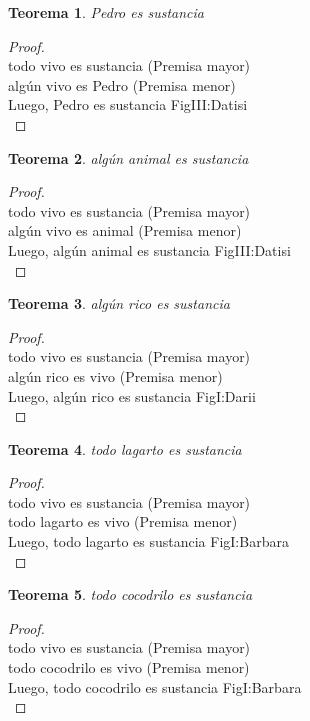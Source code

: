 ﻿\documentclass[12pt]{book}
\newtheorem{theorem}{Teorema}[chapter]
\newtheorem{proof}{Demostración}
\begin{document}
\begin{theorem}
Pedro es sustancia
\label{th: 97}
\end{theorem}\begin{proof}\\todo vivo es sustancia	 (Premisa mayor) \\algún vivo es Pedro	 (Premisa menor) \\Luego, Pedro es sustancia	FigIII:Datisi \\ \end{proof}
\begin{theorem}
algún animal es sustancia
\label{th: 98}
\end{theorem}\begin{proof}\\todo vivo es sustancia	 (Premisa mayor) \\algún vivo es animal	 (Premisa menor) \\Luego, algún animal es sustancia	FigIII:Datisi \\ \end{proof}
\begin{theorem}
algún rico es sustancia
\label{th: 99}
\end{theorem}\begin{proof}\\todo vivo es sustancia	 (Premisa mayor) \\algún rico es vivo	 (Premisa menor) \\Luego, algún rico es sustancia	FigI:Darii \\ \end{proof}
\begin{theorem}
todo lagarto es sustancia
\label{th: 100}
\end{theorem}\begin{proof}\\todo vivo es sustancia	 (Premisa mayor) \\todo lagarto es vivo	 (Premisa menor) \\Luego, todo lagarto es sustancia	FigI:Barbara \\ \end{proof}
\begin{theorem}
todo cocodrilo es sustancia
\label{th: 101}
\end{theorem}\begin{proof}\\todo vivo es sustancia	 (Premisa mayor) \\todo cocodrilo es vivo	 (Premisa menor) \\Luego, todo cocodrilo es sustancia	FigI:Barbara \\ \end{proof}
\end{document}
